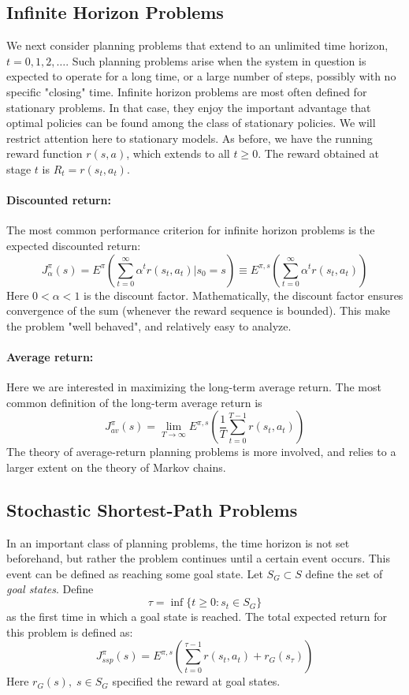 \subsection{Infinite Horizon Problems}
We next consider planning problems that extend to an unlimited time horizon, $t = 0,1,2, \ldots $. Such planning problems arise when the system in question is expected to operate for a long time, or a large number of steps, possibly with no specific "closing" time.
Infinite horizon problems are most often defined for stationary problems. In that case, they enjoy the important advantage that optimal policies can be found among the class of stationary policies.  We will restrict attention here to stationary models.
As before, we have the running reward function $r(s,a)$, which extends to all $t \ge 0$. The reward obtained at stage $t$ is  ${R_t} = r({s_t},{a_t})$.

\paragraph{Discounted return:} The most common performance criterion for infinite horizon problems is the expected discounted return:
\[J_\alpha ^\pi (s) = {E^\pi }\left(\sum\limits_{t = 0}^\infty  {{\alpha ^t}r({s_t},{a_t})} |{s_0} = s\right) \equiv {E^{\pi ,s}}\left(\sum\limits_{t = 0}^\infty  {{\alpha ^t}r({s_t},{a_t})} \right)\]
Here $0 < \alpha  < 1$ is the discount factor. Mathematically, the discount factor ensures convergence of the sum (whenever the reward sequence is bounded). This make the problem "well behaved", and relatively easy to analyze.
\paragraph{Average return:}  Here we are interested in maximizing the long-term average return. The most common definition of the long-term average return is
\[J_{av}^\pi (s) = \mathop {\lim }\limits_{T \to \infty } {E^{\pi ,s}}\left(\frac{1}{T}\sum\limits_{t = 0}^{T - 1} {r({s_t},{a_t})} \right)\]
The theory of average-return planning problems is more involved, and relies to a larger extent on the theory of Markov chains.


\subsection{Stochastic Shortest-Path Problems}
In an important class of planning problems, the time horizon is not set beforehand, but rather the problem continues until a certain event occurs. This event can be defined as reaching some goal state.
Let  ${S_G} \subset S$ define the set of \emph{goal states}. Define
\[\tau  = \inf \{ t \ge 0:{s_t} \in {S_G}\} \]
as the first time in which a goal state is reached. The total expected return for this problem is defined as:
\[J_{ssp}^\pi (s) = {E^{\pi ,s}}\left(\sum\limits_{t = 0}^{\tau  - 1} {r({s_t},{a_t})}  + {r_G}({s_\tau })\right)\]
Here ${r_G}(s),\;s \in {S_G}$ specified the reward at goal states.


